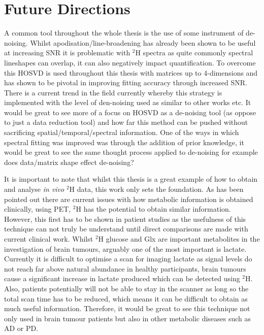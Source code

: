 \section{Future Directions}

A common tool throughout the whole thesis is the use of some instrument of de-noising. Whilst apodisation/line-broadening has already been shown to be useful at increasing \ac{SNR} it is problematic with $^2$H spectra as quite commonly spectral lineshapes can overlap, it can also negatively impact quantification. To overcome this \ac{HOSVD} is used throughout this thesis with matrices up to 4-dimensions and has shown to be pivotal in improving fitting accuracy through increased \ac{SNR}. There is a current trend in the field currently whereby this strategy is implemented with the level of den-noising used as similar to other works etc. It would be great to see more of a focus on \ac{HOSVD} as a de-noising tool (as oppose to just a data reduction tool) and how far this method can be pushed without sacrificing spatial/temporal/spectral information. One of the ways in which spectral fitting was improved was through the addition of prior knowledge, it would be great to see the same thought process applied to de-noising for example does data/matrix shape effect de-noising?

It is important to note that whilst this thesis is a great example of how to obtain and analyse \textit{in vivo} $^2$H data, this work only sets the foundation. As has been pointed out there are current issues with how metabolic information is obtained clinically, using \ac{PET}, $^2$H has the potential to obtain similar information. However, this first has to be shown in patient studies as the usefulness of this technique can not truly be understand until direct comparisons are made with current clinical work. Whilst $^2$H glucose and Glx are important metabolites in the investigation of brain tumours, arguably one of the most important is lactate. Currently it is difficult to optimise a scan for imaging lactate as signal levels do not reach far above natural abundance in healthy participants, brain tumours cause a significant increase in lactate produced which can be detected using $^2$H. Also, patients potentially will not be able to stay in the scanner as long so the total scan time has to be reduced, which means it can be difficult to obtain as much useful information. Therefore, it would be great to see this technique not only used in brain tumour patients but also in other metabolic diseases such as \ac{AD} or \ac{PD}.

